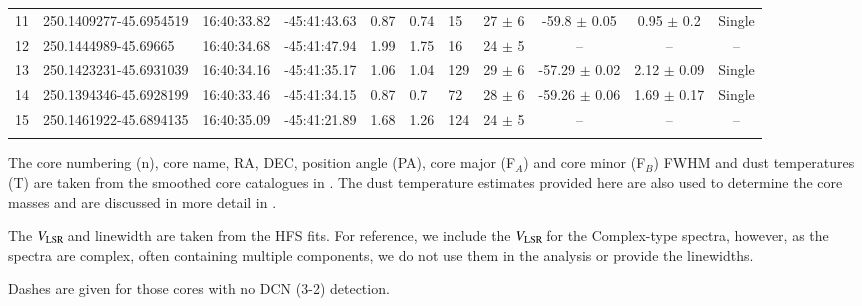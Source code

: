 \documentclass[longauth]{aa} %
\newcommand{\vlsr}{\mbox{$V_{\rm LSR}$\,}}
\begin{document}
\begin{table}[htbp!]
\begin{threeparttable}[c]
\begin{tabular}{llllllllccc}
11  &  250.1409277-45.6954519  &  16:40:33.82  &  -45:41:43.63  &  0.87  &  0.74  &  15  &  27 $\pm$ 6  &  -59.8 $\pm$ 0.05  &  0.95 $\pm$ 0.2  &  Single \\
12  &  250.1444989-45.69665  &  16:40:34.68  &  -45:41:47.94  &  1.99  &  1.75  &  16  &  24 $\pm$ 5  &  --  &  --  &  -- \\
13  &  250.1423231-45.6931039  &  16:40:34.16  &  -45:41:35.17  &  1.06  &  1.04  &  129  &  29 $\pm$ 6  &  -57.29 $\pm$ 0.02  &  2.12 $\pm$ 0.09  &  Single \\
14  &  250.1394346-45.6928199  &  16:40:33.46  &  -45:41:34.15  &  0.87  &  0.7  &  72  &  28 $\pm$ 6  &  -59.26 $\pm$ 0.06  &  1.69 $\pm$ 0.17  &  Single \\
15  &  250.1461922-45.6894135  &  16:40:35.09  &  -45:41:21.89  &  1.68  &  1.26  &  124  &  24 $\pm$ 5  &  --  &  --  &  -- \\

\hline \noalign {\smallskip}
\end{tabular}
\begin{tablenotes}
\item[1] The core numbering (n), core name, RA, DEC, position angle (PA), core major (F$_{A}$) and core minor (F$_{B}$) FWHM and dust temperatures (T) are taken from the smoothed core catalogues in \citet{louvet22}. The dust temperature estimates provided here are also used to determine the core masses and are discussed in more detail in \citet{louvet22}. 
\item[2] The \vlsr and linewidth are taken from the HFS fits. For reference, we include the \vlsr for the Complex-type spectra, however, as the spectra are complex, often containing multiple components, we do not use them in the analysis or provide the linewidths. 
\item[3] Dashes are given for those cores with no DCN (3-2) detection.
%
\end{tablenotes}
\end{threeparttable}
\end{table}
\end{document}
